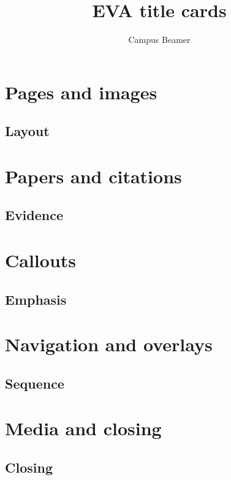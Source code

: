 \documentclass[theme=eva,language=english,cjk=false,aspectratio=43]{campusbeamer}
\title{EVA title cards}
\author{Campus Beamer}
\date{}
\begin{document}
\maketitle
\section{Pages and images}
\subsection{Layout}
\section{Papers and citations}
\subsection{Evidence}
\section{Callouts}
\subsection{Emphasis}
\section{Navigation and overlays}
\subsection{Sequence}
\section{Media and closing}
\subsection{Closing}
\backmatter
\end{document}
